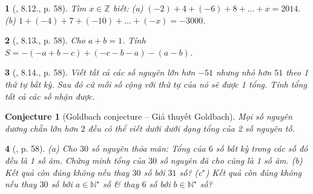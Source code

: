 \documentclass{article}
\newtheorem{baitoan}{}
\newtheorem{conjecture}{Conjecture}
\begin{document}
\begin{baitoan}[\cite{Binh_boi_duong_Toan_6_tap_1}, 8.12., p. 58]
	Tìm $x\in\mathbb{Z}$ biết: (a) $(-2) + 4 + (-6) + 8 + \ldots + x = 2014$. (b) $1 + (-4) + 7 + (-10) + \ldots + (-x) = -3000$.
\end{baitoan}

\begin{baitoan}[\cite{Binh_boi_duong_Toan_6_tap_1}, 8.13., p. 58]
	Cho $a + b = 1$. Tính $S = -(-a + b - c) + (-c - b - a) - (a - b)$.
\end{baitoan}

\begin{baitoan}[\cite{Binh_boi_duong_Toan_6_tap_1}, 8.14., p. 58]
	Viết tất cả các số nguyên lớn hơn $-51$ nhưng nhỏ hơn $51$ theo 1 thứ tự bất kỳ. Sau đó cứ mỗi số cộng với thứ tự của nó sẽ được 1 tổng. Tính tổng tất cả các số nhận được.
\end{baitoan}

\begin{conjecture}[Goldbach conjecture -- Giả thuyết Goldbach]
	Mọi số nguyên dương chẵn lớn hơn $2$ đều có thể viết dưới dưới dạng tổng của 2 số nguyên tố.
\end{conjecture}

\begin{baitoan}[\cite{Binh_boi_duong_Toan_6_tap_1}, p. 58]
	(a) Cho $30$ số nguyên thỏa mãn: Tổng của $6$ số bất kỳ trong các số đó đều là 1 số âm. Chứng minh tổng của $30$ số nguyên đã cho cũng là 1 số âm. (b) Kết quả còn đúng không nếu thay $30$ số bởi $31$ số? (c${}^\star$) Kết quả còn đúng không nếu thay $30$ số bởi $a\in\mathbb{N}^\star$ số \& thay $6$ số bởi $b\in\mathbb{N}^\star$ số?
\end{baitoan}


\printbibliography[heading=bibintoc]
\end{document}
